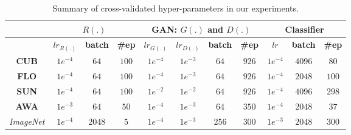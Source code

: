 \documentclass[runningheads]{llncs}
\begin{document}
\begin{table}[t]
\centering
\caption{Summary of cross-validated hyper-parameters in our experiments.}
\label{tab:hyp}
\begin{tabular}{|lcccccccccc|}
\hline
    &  \multicolumn{3}{|c|}{$R(.)$} & \multicolumn{4}{|c|}{GAN: $G(.)$ and $D(.)$} & \multicolumn{3}{|c|}{Classifier} \\
    \hline
    & \multicolumn{1}{|c|}{$lr_{R(.)}$}& \multicolumn{1}{|c|}{\textbf{batch}}    & \multicolumn{1}{|c|}{\textbf{\#ep}}
    & \multicolumn{1}{|c|}{\textbf{$lr_{G(.)}$}}  & \multicolumn{1}{|c|}{\textbf{$lr_{D(.)}$}} & \multicolumn{1}{|c|}{\textbf{batch}} & \multicolumn{1}{|c|}{\textbf{\#ep}} 
    & \multicolumn{1}{|c|}{\textbf{$lr$}}   & \multicolumn{1}{|c|}{\textbf{batch}}  & \multicolumn{1}{|c|}{\textbf{\#ep}} 
    \\ \hline
\multicolumn{1}{|c|}{\textbf{CUB}} & \multicolumn{1}{|c|}{$1e^{-4}$} & \multicolumn{1}{|c|}{$64$} & \multicolumn{1}{|c|}{$100$} & \multicolumn{1}{|c|}{$1e^{-4}$} & \multicolumn{1}{|c|}{$1e^{-3}$} & \multicolumn{1}{|c|}{$64$} & \multicolumn{1}{|c|}{$926$} & \multicolumn{1}{|c|}{$1e^{-4}$} & \multicolumn{1}{|c|}{$4096$} & \multicolumn{1}{|c|}{$80$} \\
\multicolumn{1}{|c|}{\textbf{FLO}} & \multicolumn{1}{|c|}{$1e^{-4}$} & \multicolumn{1}{|c|}{$64$} & \multicolumn{1}{|c|}{$100$} & \multicolumn{1}{|c|}{$1e^{-4}$} & \multicolumn{1}{|c|}{$1e^{-3}$} & \multicolumn{1}{|c|}{$64$} & \multicolumn{1}{|c|}{$926$} & \multicolumn{1}{|c|}{$1e^{-4}$} & \multicolumn{1}{|c|}{$2048$} & \multicolumn{1}{|c|}{$100$} \\
\multicolumn{1}{|c|}{\textbf{SUN}} & \multicolumn{1}{|c|}{$1e^{-4}$} & \multicolumn{1}{|c|}{$64$} & \multicolumn{1}{|c|}{$100$} & \multicolumn{1}{|c|}{$1e^{-2}$} & \multicolumn{1}{|c|}{$1e^{-2}$} & \multicolumn{1}{|c|}{$64$} & \multicolumn{1}{|c|}{$926$} & \multicolumn{1}{|c|}{$1e^{-4}$} & \multicolumn{1}{|c|}{$4096$} & \multicolumn{1}{|c|}{$298$} \\
\multicolumn{1}{|c|}{\textbf{AWA}} & \multicolumn{1}{|c|}{$1e^{-3}$} & \multicolumn{1}{|c|}{$64$} & \multicolumn{1}{|c|}{$50$} & \multicolumn{1}{|c|}{$1e^{-4}$} & \multicolumn{1}{|c|}{$1e^{-3}$} & \multicolumn{1}{|c|}{$64$} & \multicolumn{1}{|c|}{$350$} & \multicolumn{1}{|c|}{$1e^{-4}$} & \multicolumn{1}{|c|}{$2048$} & \multicolumn{1}{|c|}{$37$} \\

\multicolumn{1}{|c|}{\textit{ImageNet}} & \multicolumn{1}{|c|}{$1e^{-4}$} & \multicolumn{1}{|c|}{$2048$} & \multicolumn{1}{|c|}{$5$} & \multicolumn{1}{|c|}{$1e^{-4}$} & \multicolumn{1}{|c|}{$1e^{-3}$} & \multicolumn{1}{|c|}{$256$} & \multicolumn{1}{|c|}{$300$} & \multicolumn{1}{|c|}{$1e^{-3}$} & \multicolumn{1}{|c|}{$2048$} & \multicolumn{1}{|c|}{$300$} 


\\ \hline
\end{tabular}
\end{table}
\end{document}
